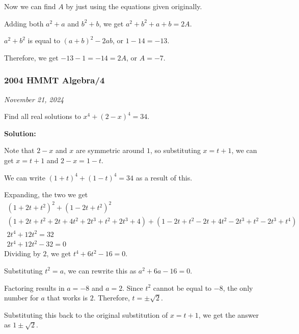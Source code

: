 \documentclass[../mathproblems.tex]{subfiles}
\begin{document}
Now we can find $A$ by just using the equations given originally.

Adding both $a^2+a$ and $b^2+b$, we get $a^2+b^2+a+b=2A$.

$a^2+b^2$ is equal to $(a+b)^2-2ab$, or $1-14 = -13$.

Therefore, we get $-13-1=-14 = 2A$, or $A=\boxed{-7}$.

\noindent\hrulefill
\subsubsection*{2004 HMMT Algebra/4} 
\textit{November 21, 2024}

Find all real solutions to $x^4+(2-x)^4=34$.

\textbf{Solution:}

Note that $2-x$ and $x$ are symmetric around $1$, so substituting $x=t+1$, we can get $x=t+1$ and $2-x=1-t$.

We can write $(1+t)^4+(1-t)^4=34$ as a result of this.

Expanding, the two we get
\begin{align*} (1+2t+t^2)^2+(1-2t+t^2)^2\\ (1+2t+t^2+2t+4t^2+2t^3+t^2+2t^3+4)+(1-2t+t^2-2t+4t^2-2t^3+t^2-2t^3+t^4)\\ 2t^4+12t^2=32\\ 2t^4+12t^2-32=0 \end{align*}
Dividing by $2$, we get $t^4+6t^2-16=0$.

Substituting $t^2=a$, we can rewrite this as $a^2+6a-16=0$.

Factoring results in $a=-8$ and $a=2$. Since $t^2$ cannot be equal to $-8$, the only number for $a$ that works is $2$. Therefore, $t=\pm\sqrt{2}$.

Substituting this back to the original substitution of $x=t+1$, we get the answer as $\boxed{1\pm\sqrt{2}}$.

\noindent\hrulefill
\end{document}
